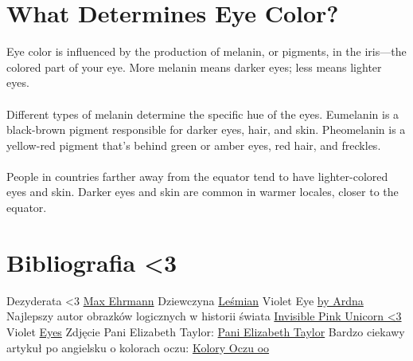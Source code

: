 \documentclass[12pt]{article}
\begin{document}
\section{What Determines Eye Color?}
Eye color is influenced by the production of melanin, or pigments, in the iris—the colored part of your eye. More melanin means darker eyes; less means lighter eyes.
\paragraph{}
Different types of melanin determine the specific hue of the eyes. Eumelanin is a black-brown pigment responsible for darker eyes, hair, and skin. Pheomelanin is a yellow-red pigment that's behind green or amber eyes, red hair, and freckles.
\paragraph{}
People in countries farther away from the equator tend to have lighter-colored eyes and skin. Darker eyes and skin are common in warmer locales, closer to the equator. \cite{EColor}

\section{Bibliografia \textless3}
\begin{thebibliography}{3}
 Dezyderata \textless3 \href{https://www.fuw.edu.pl/~jziel/dezyderata.html}{Max Ehrmann}
 Dziewczyna \href{https://literat.ug.edu.pl/lesman/dziewcz.htm}{Leśmian}
 Violet Eye \href{https://www.griddlers.net/pl_PL/nonogram/-/g/65121}{by Ardna}
 Najlepszy autor obrazków logicznych w historii świata \href{https://www.griddlers.net/pl_PL/nonogram/-/g/p0/pp30/ta/sa/va/th0/i01/s0-100/c2-8/p1-100/d0-10000000000?_gpuzzles_WAR_puzzles_u=Ardna}{Invisible Pink Unicorn \textless3}
 Violet \href{https://www.allaboutvision.com/eye-care/eye-anatomy/violet-eyes/}{Eyes}
 Zdjęcie Pani Elizabeth Taylor: \href{https://pl.pinterest.com/pin/364017582374286320}{Pani Elizabeth Taylor}
 Bardzo ciekawy artykuł po angielsku o kolorach oczu: \href{https://www.verywellhealth.com/what-is-the-rarest-eye-color-5087302}{Kolory Oczu oo}
\end{thebibliography}

\newpage
\tableofcontents
\end{document}
